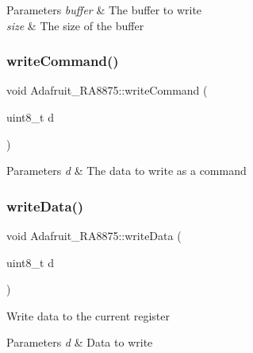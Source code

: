 \begin{DoxyParams}{Parameters}
{\em buffer} & The buffer to write \\
\hline
{\em size} & The size of the buffer \\
\hline
\end{DoxyParams}
\mbox{\label{class_adafruit___r_a8875_a65c88e13691db0d8cae5b5e32883268e}} 
\subsubsection{\texorpdfstring{writeCommand()}{writeCommand()}}
{\footnotesize\ttfamily void Adafruit\+\_\+\+R\+A8875\+::write\+Command (\begin{DoxyParamCaption}\item[{uint8\+\_\+t}]{d }\end{DoxyParamCaption})}


\begin{DoxyParams}{Parameters}
{\em d} & The data to write as a command \\
\hline
\end{DoxyParams}
\mbox{\label{class_adafruit___r_a8875_ada2fe2eaba6203691b422c0f561c8a94}} 
\subsubsection{\texorpdfstring{writeData()}{writeData()}}
{\footnotesize\ttfamily void Adafruit\+\_\+\+R\+A8875\+::write\+Data (\begin{DoxyParamCaption}\item[{uint8\+\_\+t}]{d }\end{DoxyParamCaption})}

Write data to the current register


\begin{DoxyParams}{Parameters}
{\em d} & Data to write \\
\hline
\end{DoxyParams}
\mbox{\label{class_adafruit___r_a8875_a2e6a3f2fd43716ddb5c279e0a456369f}} 
